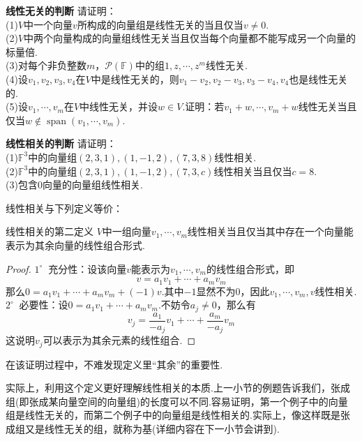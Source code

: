 \documentclass[lang=cn, zihao=5]{elegantbook}
\newcommand{\F}{\mathbb{F}}
\newcommand{\buzhou}[1]{$#1^{\circ} \ $}
\DeclareMathOperator{\spn}{span}
\newcommand{\examplefont}[1]{\color{mgreen} \textbf{#1}}
\begin{document}
\begin{example}{\examplefont{线性无关的判断}}
	请证明： \\
	(1)$V$中一个向量$v$所构成的向量组是线性无关的当且仅当$v \neq 0$. \\
	(2)$V$中两个向量构成的向量组线性无关当且仅当每个向量都不能写成另一个向量的标量倍. \\
	(3)对每个非负整数$m$，$\mathcal{P} (\F)$中的组$1,z, \cdots ,z^m$线性无关. \\
	(4)设$v_1,v_2,v_3,v_4$在$V$中是线性无关的，则$v_1-v_2,v_2-v_3,v_3-v_4,v_4$也是线性无关的. \\
	(5)设$v_1, \cdots ,v_m$在$V$中线性无关，并设$w \in V$.证明：若$v_1+w , \cdots ,v_m+w$线性无关当且仅当$w \notin \spn (v_1 , \cdots ,v_m)$.
\end{example}

\begin{example}{\examplefont{线性相关的判断}}
	请证明： \\
	(1)$\F ^{3}$中的向量组$(2,3,1),(1,-1,2),(7,3,8)$线性相关. \\
	(2)$\F ^{3}$中的向量组$(2,3,1),(1,-1,2),(7,3,c)$线性相关当且仅当$c=8$. \\
	(3)包含$0$向量的向量组线性相关.
\end{example}

线性相关与下列定义等价：

\begin{proposition}{线性相关的第二定义}
	$V$中一组向量$v_1, \cdots ,v_m$线性相关当且仅当其中存在一个向量能表示为其余向量的线性组合形式.
\end{proposition}
\begin{proof}
	\buzhou{1} 充分性：设该向量$v$能表示为$v_1, \cdots ,v_m$的线性组合形式，即$$v= a_1v_1 + \cdots + a_mv_m$$
	那么$0=a_1v_1 + \cdots + a_mv_m + (-1)v$.其中$-1$显然不为$0$，因此$v_1, \cdots ,v_m,v$线性相关. \\
	\buzhou{2} 必要性：设$0=a_1v_1 + \cdots + a_mv_m$.不妨令$a_j \neq 0$，那么有$$v_j = \frac{a_1}{-a_j} v_1 + \cdots + \frac{a_m}{-a_j} v_m$$
	这说明$v_j$可以表示为其余元素的线性组合.
\end{proof}
\begin{remark}
	在该证明过程中，不难发现定义里“其余”的重要性.
\end{remark}

实际上，利用这个定义更好理解线性相关的本质.上一小节的例题告诉我们，张成组(即张成某向量空间的向量组)的长度可以不同.容易证明，第一个例子中的向量组是线性无关的，而第二个例子中的向量组是线性相关的.实际上，像这样既是张成组又是线性无关的组，就称为基(详细内容在下一小节会讲到).
\end{document}
